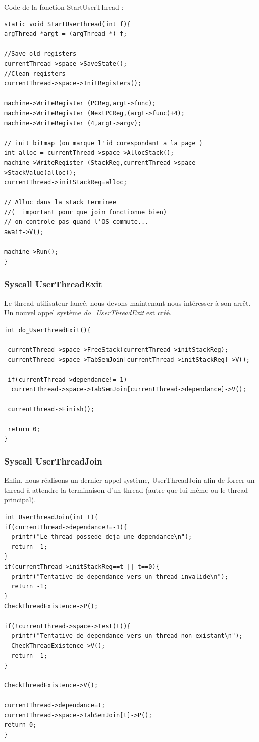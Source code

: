\documentclass[a4paper,10pt]{article}
\begin{document}
Code de la fonction StartUserThread :
\begin{lstlisting}[frame=single]
 static void StartUserThread(int f){
argThread *argt = (argThread *) f;

//Save old registers
currentThread->space->SaveState();
//Clean registers
currentThread->space->InitRegisters();

machine->WriteRegister (PCReg,argt->func);
machine->WriteRegister (NextPCReg,(argt->func)+4);
machine->WriteRegister (4,argt->argv);

// init bitmap (on marque l'id corespondant a la page )
int alloc = currentThread->space->AllocStack();
machine->WriteRegister (StackReg,currentThread->space->StackValue(alloc));
currentThread->initStackReg=alloc;

// Alloc dans la stack terminee
//(  important pour que join fonctionne bien)
// on controle pas quand l'OS commute...
await->V();

machine->Run();
}
\end{lstlisting}
\newpage
\subsubsection{Syscall UserThreadExit}
Le thread utilisateur lancé, nous devons maintenant nous intéresser à son arrêt.
Un nouvel appel système \textit{do\_UserThreadExit} est créé.


\begin{lstlisting}[frame=single]
 int do_UserThreadExit(){

 currentThread->space->FreeStack(currentThread->initStackReg);
 currentThread->space->TabSemJoin[currentThread->initStackReg]->V();
 
 if(currentThread->dependance!=-1)
  currentThread->space->TabSemJoin[currentThread->dependance]->V();
 
 currentThread->Finish();
 
 return 0;
}
\end{lstlisting}
\newpage
\subsubsection{Syscall UserThreadJoin}
Enfin, nous réalisons un dernier appel système, UserThreadJoin afin de forcer un thread à attendre la terminaison d'un thread (autre que lui même ou le thread principal).

\begin{lstlisting}[frame=single]
 int UserThreadJoin(int t){
if(currentThread->dependance!=-1){
  printf("Le thread possede deja une dependance\n");
  return -1;
}
if(currentThread->initStackReg==t || t==0){
  printf("Tentative de dependance vers un thread invalide\n");
  return -1;
}
CheckThreadExistence->P();

if(!currentThread->space->Test(t)){
  printf("Tentative de dependance vers un thread non existant\n");
  CheckThreadExistence->V();
  return -1;
}

CheckThreadExistence->V();

currentThread->dependance=t;
currentThread->space->TabSemJoin[t]->P();
return 0;
}
\end{lstlisting}
\end{document}
